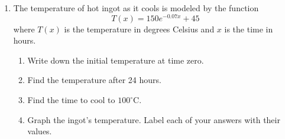 \documentclass[12pt, twoside]{article}
\begin{document}
\begin{enumerate}
\item The temperature of hot ingot as it cools is modeled by the function 
    \[ T(x)=150e^{-0.07x}+45 \] where $T(x)$
    is the temperature in degrees Celsius and $x$ is the time in hours.
    \begin{enumerate}[itemsep=1cm]
        \item Write down the initial temperature at time zero.
        \item Find the temperature after 24 hours.
        \item Find the time to cool to $100^\circ$C.
        \item Graph the ingot's temperature. Label each of your answers with their values.
    \end{enumerate}
    \begin{center}
    \end{center}

\end{enumerate}
\end{document}
